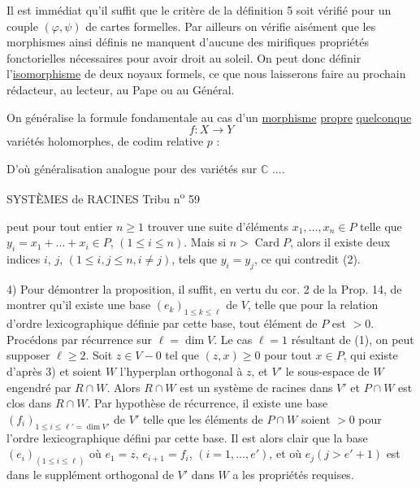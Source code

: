 Il est immédiat qu'il suffit que le critère de la définition 5 soit vérifié pour un couple $(\varphi,\psi)$ de cartes formelles. Par ailleurs on vérifie aisément que les morphismes ainsi définis ne manquent d'aucune des mirifiques propriétés fonctorielles nécessaires pour avoir droit au soleil. On peut donc définir l'\uline{isomorphisme} de deux noyaux formels, ce que nous laisserons faire au prochain rédacteur, au lecteur, au Pape ou au Général.

On généralise la formule fondamentale au cas d'un \uline{morphisme} \uline{propre} \uline{quelconque}
\[
 f:X\longrightarrow Y
\]
  variétés  holomorphes,  de codim relative $p$ :

D'où généralisation analogue pour des variétés  sur $\mathbb C$ ....

SYSTÈMES de RACINES \hfill Tribu n\textsuperscript{o} 59

peut pour tout entier $n\geq 1$ trouver une suite d'éléments $x_1,\ldots,x_n\in P$ telle que $y_i=x_1+\ldots+x_i\in P$, $(1\leq i\leq n)$. Mais si $n>\operatorname{Card}P$, alors il existe deux indices $i$, $j$, $(1\leq i,j\leq n,i\neq j)$, tels que $y_i=y_j$, ce qui contredit (2).

4) Pour démontrer la proposition, il suffit, en vertu du cor. 2 de la Prop. 14, de montrer qu'il existe une base $(e_k)_{1\leq k\leq\ell}$ de $V$, telle que pour la relation d'ordre lexicographique définie par cette base, tout élément de $P$ est $>0$. Procédons par récurrence sur $\ell=\dim V$. Le cas $\ell=1$ résultant de (1), on peut supposer $\ell\geq 2$. Soit $z\in V-0$ tel que $(z,x)\geq 0$ pour tout $x\in P$, qui existe d'après 3) et soient $W$ l'hyperplan orthogonal à $z$, et $V'$ le sous-espace de $W$ engendré par $R\cap W$. Alors $R\cap W$ est un système de racines dans $V'$ et $P\cap W$ est clos dans $R\cap W$. Par hypothèse de récurrence, il existe une base $(f_i)_{1\leq i\leq\ell'=\dim V'}$ de $V'$ telle que les éléments de $P\cap W$ soient $>0$ pour l'ordre lexicographique défini par cette base. Il est alors clair que la base $(e_i)_{(1\leq i\leq\ell)}$ où $e_1=z$, $e_{i+1}=f_i$, $(i=1,\ldots,e')$, et où $e_j(j>e'+1)$ est dans le supplément orthogonal de $V'$ dans $W$ a les propriétés requises.

